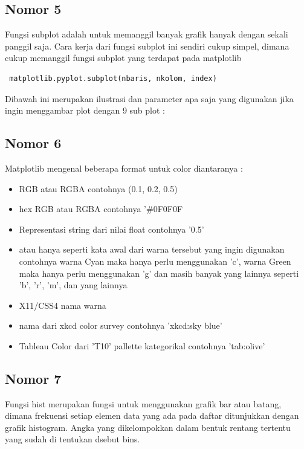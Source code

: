 	\subsection{Nomor 5}
	Fungsi subplot adalah untuk memanggil banyak grafik hanyak dengan sekali panggil saja. Cara kerja dari fungsi subplot ini sendiri cukup simpel, dimana cukup memanggil fungsi subplot yang terdapat pada matplotlib 
	\begin{verbatim} matplotlib.pyplot.subplot(nbaris, nkolom, index) \end{verbatim}
	Dibawah ini merupakan ilustrasi dan parameter apa saja yang digunakan jika ingin menggambar plot dengan 9 sub plot :
		
		
	\subsection{Nomor 6}
	Matplotlib mengenal beberapa format untuk color diantaranya :
		\begin{itemize}
			\item RGB atau RGBA contohnya (0.1, 0.2, 0.5)
			\item hex RGB atau RGBA contohnya '\#0F0F0F
			\item Representasi string dari nilai float contohnya '0.5'
			\item atau hanya seperti kata awal dari warna tersebut yang ingin digunakan contohnya warna Cyan maka hanya perlu menggunakan 'c', warna Green maka hanya perlu menggunakan 'g' dan masih banyak yang lainnya seperti 'b', 'r', 'm', dan yang lainnya
			\item X11/CSS4 nama warna
			\item nama dari xkcd color survey contohnya 'xkcd:sky blue'
			\item Tableau Color dari 'T10' pallette kategorikal contohnya 'tab:olive'
			
		\end{itemize}
	
	\subsection{Nomor 7}
	Fungsi hist merupakan fungsi untuk menggunakan grafik bar atau batang, dimana frekuensi setiap elemen data yang ada pada daftar ditunjukkan dengan grafik histogram. Angka yang dikelompokkan dalam bentuk rentang tertentu yang sudah di tentukan dsebut bins.
		
	
